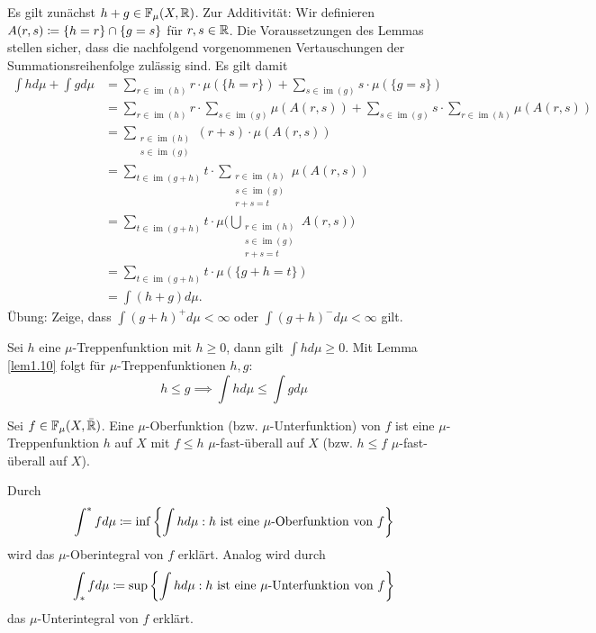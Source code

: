 \documentclass[a4paper,twoside,DIV15,BCOR12mm]{scrbook}
\DeclareMathOperator{\im}{im}
\begin{document}
\begin{beweis}
Es gilt zunächst $h+g \in \mathbb F_\mu(X,\mathbb{R})$. Zur Additivität: Wir definieren $A(r,s) \da \{h=r\} \cap \{g=s\}$ für $r,s\in\mathbb{R}$. Die Voraussetzungen des Lemmas stellen sicher, 
dass die nachfolgend vorgenommenen Vertauschungen der Summationsreihenfolge zulässig sind. Es gilt damit
\begin{align*}
\int hd\mu + \int gd\mu 
&= \sum_{r\in\im(h)} r\cdot \mu(\{h=r\}) + \sum_{s\in \im(g)} s \cdot \mu(\{g=s\}) \\
&= \sum_{r\in\im(h)} r \cdot \sum_{s\in \im(g)} \mu(A(r,s)) + \sum_{s\in\im(g)} s \cdot \sum_{r\in \im(h)} \mu(A(r,s)) \\
&= \sum_{\substack{r\in\im(h)\\s\in\im(g)}} (r+s)\cdot \mu(A(r,s)) \\
&= \sum_{t\in \im(g+h)} t \cdot \sum_{\substack{r\in \im(h) \\s\in\im(g)\\r+s=t}} \mu(A(r,s)) \\
&= \sum_{t\in \im(g+h)} t \cdot \mu\big(\bigcup_{\substack{r\in \im(h) \\s\in\im(g)\\r+s=t}} A(r,s)\big) \\
&= \sum_{t\in \im(g+h)} t \cdot \mu(\{g+h=t\}) \\
&= \int (h+g) d\mu .
\end{align*}
Übung: Zeige, dass $\int (g+h)^+ d\mu<\infty$ oder $\int (g+h)^- d\mu<\infty$ gilt.
\end{beweis}

\begin{bemerkung}
Sei $h$ eine $\mu$-Treppenfunktion mit $h\ge 0$, dann gilt $\int hd\mu \ge 0$. Mit Lemma \ref{lem1.10} folgt für $\mu$-Treppenfunktionen $h,g$:
\[
h \le g \implies \int h d\mu \le \int g d\mu
\]
\end{bemerkung}

\begin{definition}
Sei $f\in\mathbb F_\mu(X,\bar{\mathbb{R}})$. Eine $\mu$-Oberfunktion (bzw. $\mu$-Unterfunktion) von $f$ ist eine $\mu$-Treppenfunktion $h$ auf $X$ mit $f\le h$ $\mu$-fast-überall auf $X$ (bzw. $h\le f$ $\mu$-fast-überall auf $X$).

Durch
\[
\int^* fd\mu \da \inf\left\{\int hd\mu : \text{$h$ ist eine $\mu$-Oberfunktion von $f$}\right\}
\]
wird das $\mu$-Oberintegral von $f$ erklärt.
Analog wird durch
\[
\int_* fd\mu \da \sup\left\{\int hd\mu : \text{$h$ ist eine $\mu$-Unterfunktion von $f$}\right\}
\]
das $\mu$-Unterintegral von $f$ erklärt.
\end{definition}
\end{document}
